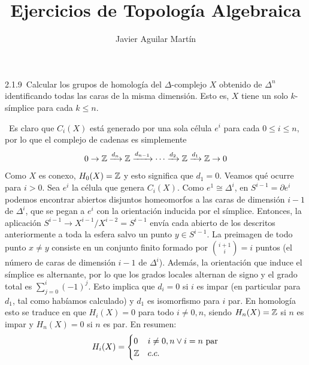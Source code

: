 \documentclass[twoside]{article}
\begin{document}
\title{Ejercicios de Topología Algebraica}
\author{Javier Aguilar Martín}
\maketitle

\begin{ejercicio}{2.1.9}\
Calcular los grupos de homología del $\Delta$-complejo $X$ obtenido de $\Delta^n$ identificando todas las caras de la misma dimensión. Esto es, $X$ tiene un solo $k$-símplice para cada $k\leq n$. 

 

\end{ejercicio}
\begin{solucion}\
Es claro que $C_i(X)$ está generado por una sola célula $e^i$ para cada $0\leq i\leq n$, por lo que el complejo de cadenas es simplemente
\[
0\to \mathbb{Z}\xrightarrow{d_n}\mathbb{Z}\xrightarrow{d_{n-1}}\cdots \xrightarrow{d_2}\mathbb{Z}\xrightarrow{d_1}\mathbb{Z}\to 0
\]
Como $X$ es conexo, $H_0(X)=\mathbb{Z}$ y esto significa que $d_1=0$. Veamos qué ocurre para $i>0$. Sea $e^i$ la célula que genera $C_i(X)$. Como $e^1\cong\Delta^i$, en $S^{i-1}=\partial e^i$ podemos encontrar abiertos disjuntos homeomorfos a las caras de dimensión $i-1$ de $\Delta^i$, que se pegan a $e^i$ con la orientación inducida por el símplice. Entonces, la aplicación $S^{i-1}\to X^{i-1}/X^{i-2}=S^{i-1}$ envía cada abierto de los descritos anteriormente a toda la esfera salvo un punto $y\in S^{i-1}$. La preimagen de todo punto $x\neq y$ consiste en un conjunto finito formado por $\binom{i+1}{i}=i$ puntos (el número de caras de dimensión $i-1$ de $\Delta^i$). Además, la orientación que induce el símplice es alternante, por lo que los grados locales alternan de signo y el grado total es $\sum_{j=0}^i(-1)^j$. Esto implica que $d_i=0$ si $i$ es impar (en particular para $d_1$, tal como habíamos calculado) y $d_1$ es isomorfismo para $i$ par. En homología esto se traduce en que $H_i(X)=0$ para todo $i\neq 0,n$, siendo $H_n(X)=\mathbb{Z}$ si $n$ es impar y $H_n(X)=0$ si $n$ es par. En resumen:
\[
H_i(X)=\begin{cases}
0 & i\neq 0,n\lor i=n \text{ par}\\
\mathbb{Z} & c.c.
\end{cases}
\]
\end{solucion}

\newpage
\end{document}
